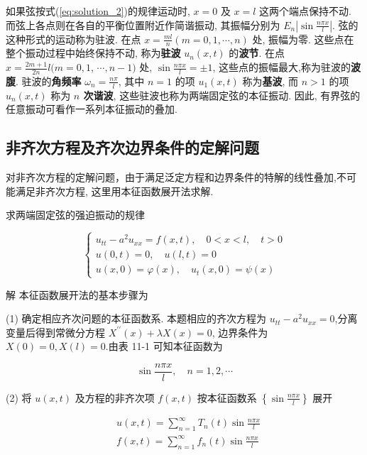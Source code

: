 \begin{enumerate}
        如果弦按式(\ref{eq:solution_2})的规律运动时, 
        $x=0$ 及 $x=l$ 这两个端点保持不动. 
        而弦上各点则在各自的平衡位置附近作简谐振动, 
        其振幅分别为 $E_{n}\left|\sin \frac{n \pi x}{l}\right|$. 
        弦的这种形式的运动称为驻波. 
        在点 $x=\frac{m l}{n}(m=0,1, \cdots, n)$ 处, 振幅为零. 
        这些点在整个振动过程中始终保持不动, 称为\textbf{驻波} $u_{n}(x, t)$ 的\textbf{波节}. 
        在点 $x=\frac{2 m+1}{2 n} l(m=0,1$, $\cdots, n-1)$ 处, 
        $\sin \frac{n \pi x}{l}= \pm 1$, 这些点的振幅最大,称为驻波的\textbf{波腹}.
         驻波的\textbf{角频率} $\omega_{n}=\frac{n \pi}{l}$, 
         其中 $n=1$ 的项 $u_{1}(x, t)$ 称为\textbf{基波}, 
         而 $n>1$ 的项 $u_{n}(x, t)$ 称为 \textbf{$n$ 次谐波}, 
         这些驻波也称为两端固定弦的本征振动. 
         因此, 有界弦的任意振动可看作一系列本征振动的叠加.
        
\end{enumerate}





\subsection{非齐次方程及齐次边界条件的定解问题}
对非齐次方程的定解问题，由于满足泛定方程和边界条件的特解的线性叠加,不可能满足非齐次方程, 这里用本征函数展开法求解.

求两端固定弦的强迫振动的规律

$$
\left\{\begin{array}{l}
u_{t t}-a^{2} u_{x x}=f(x, t), \quad 0<x<l, \quad t>0 \\
u(0, t)=0, \quad u(l, t)=0 \\
u(x, 0)=\varphi(x), \quad u_{t}(x, 0)=\psi(x)
\end{array}\right.
$$

解 本征函数展开法的基本步骤为

(1) 确定相应齐次问题的本征函数系. 本题相应的齐次方程为 $u_{t t}-a^{2} u_{x x}=0$,分离变量后得到常微分方程 $X^{\prime \prime}(x)+\lambda X(x)=0$, 边界条件为 $X(0)=0, X(l)=0$.由表 11-1 可知本征函数为

$$
\sin \frac{n \pi x}{l}, \quad n=1,2, \cdots
$$

(2) 将 $u(x, t)$ 及方程的非齐次项 $f(x, t)$ 按本征函数系 $\left\{\sin \frac{n \pi x}{l}\right\}$ 展开

$$
\begin{aligned}
& u(x, t)=\sum_{n=1}^{\infty} T_{n}(t) \sin \frac{n \pi x}{l} \\
& f(x, t)=\sum_{n=1}^{\infty} f_{n}(t) \sin \frac{n \pi x}{l}
\end{aligned}
$$

